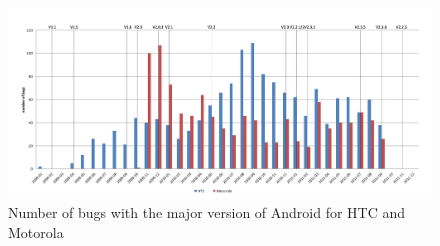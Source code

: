 \documentclass[10pt, conference, compsocconf]{IEEEtran}
\begin{document}
%
%
%

\begin{figure}[htb]
\centering
\includegraphics[width=1\textwidth]{bugovertime.png}
\caption{Number of bugs with the major version of Android for HTC and Motorola}
\label{bugovertime}
\end{figure}
\end{document}
